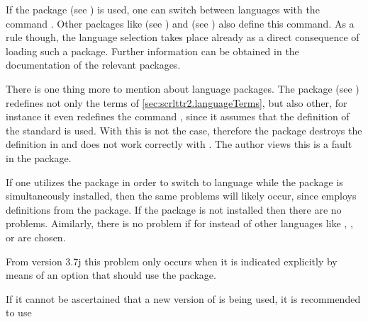 If the package  (see
\cite{package:babel}) is used, one can switch between languages with
the command .  Other
packages like  (see
\cite{package:german}) and 
(see \cite{package:ngerman}) also define this command.  As a rule
though, the language selection takes place already as a direct
consequence of loading such a package. Further information can be
obtained in the documentation of the relevant packages.

\begin{Explain}
  There is one thing more to mention about language packages.  The
  package  (see
  \cite{package:french}) redefines not only the terms of
  \autoref{sec:scrlttr2.languageTerms}, but also other, for instance
  it even redefines the command , since it assumes that
  the definition of the standard  is used.  With
   this is not the case, therefore the package
   destroys the definition in  and
  does not work correctly with \KOMAScript. The author views this is a
  fault in the  package.

  If one utilizes the  package in
  order to switch to language  while the package
   is simultaneously installed,
  then the same problems will likely occur, since 
  employs definitions from the  package. If the
  package  is not installed then there are no
  problems. Aimilarly, there is no problem if for 
  instead of  other languages like ,
  ,  or  are chosen.

  From  version 3.7j this problem only occurs when it
  is indicated explicitly by means of an option that 
  should use the  package.

  If it cannot be ascertained that a new version of  is
  being used, it is recommended to use


  \begin{lstcode}
    \usepackage[...,frenchb,...]{babel}
  \end{lstcode}


\end{Explain}
